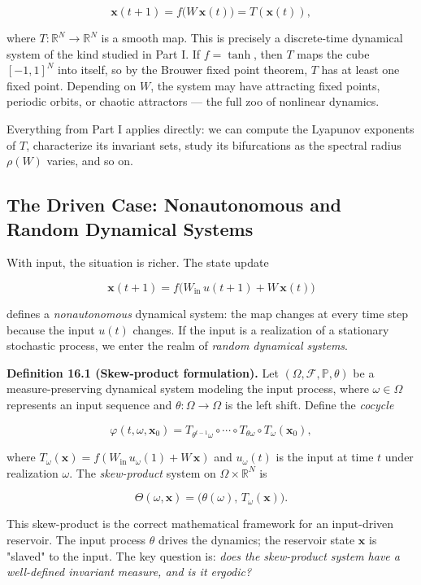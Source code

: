 \[
\mathbf{x}(t+1) = f\bigl(W\, \mathbf{x}(t)\bigr) = T(\mathbf{x}(t)),
\]

where $T: \mathbb{R}^N \to \mathbb{R}^N$ is a smooth map. This is precisely a discrete-time dynamical system of the kind studied in Part I. If $f = \tanh$, then $T$ maps the cube $[-1, 1]^N$ into itself, so by the Brouwer fixed point theorem, $T$ has at least one fixed point. Depending on $W$, the system may have attracting fixed points, periodic orbits, or chaotic attractors --- the full zoo of nonlinear dynamics.

Everything from Part I applies directly: we can compute the Lyapunov exponents of $T$, characterize its invariant sets, study its bifurcations as the spectral radius $\rho(W)$ varies, and so on.

\subsection{The Driven Case: Nonautonomous and Random Dynamical Systems}\label{sec:16.1.2}

With input, the situation is richer. The state update

\[
\mathbf{x}(t+1) = f\bigl(W_{\text{in}}\, u(t+1) + W\, \mathbf{x}(t)\bigr)
\]

defines a \textit{nonautonomous} dynamical system: the map changes at every time step because the input $u(t)$ changes. If the input is a realization of a stationary stochastic process, we enter the realm of \textit{random dynamical systems}.

\textbf{Definition 16.1 (Skew-product formulation).} Let $(\Omega, \mathcal{F}, \mathbb{P}, \theta)$ be a measure-preserving dynamical system modeling the input process, where $\omega \in \Omega$ represents an input sequence and $\theta: \Omega \to \Omega$ is the left shift. Define the \textit{cocycle}

\[
\varphi(t, \omega, \mathbf{x}_0) = T_{\theta^{t-1}\omega} \circ \cdots \circ T_{\theta \omega} \circ T_\omega(\mathbf{x}_0),
\]

where $T_\omega(\mathbf{x}) = f(W_{\text{in}}\, u_\omega(1) + W\, \mathbf{x})$ and $u_\omega(t)$ is the input at time $t$ under realization $\omega$. The \textit{skew-product} system on $\Omega \times \mathbb{R}^N$ is

\[
\Theta(\omega, \mathbf{x}) = \bigl(\theta(\omega),\, T_\omega(\mathbf{x})\bigr).
\]

This skew-product is the correct mathematical framework for an input-driven reservoir. The input process $\theta$ drives the dynamics; the reservoir state $\mathbf{x}$ is "slaved" to the input. The key question is: \textit{does the skew-product system have a well-defined invariant measure, and is it ergodic?}


